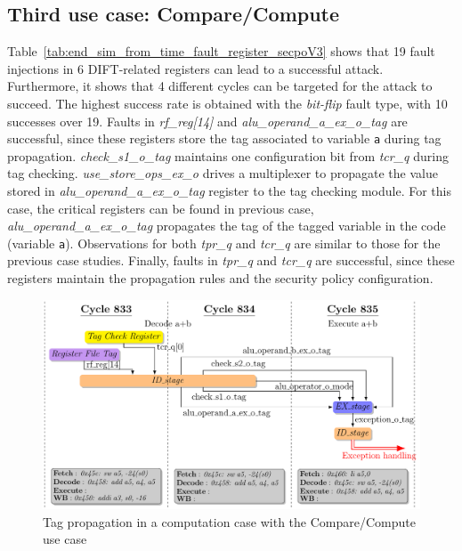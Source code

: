 \subsection{Third use case: Compare/Compute}
Table~\ref{tab:end_sim_from_time_fault_register_secpoV3} shows that 19 fault injections in 6 DIFT-related registers can lead to a successful attack. Furthermore, it shows that 4 different cycles can be targeted for the attack to succeed. The highest success rate is obtained with the \textit{bit-flip} fault type, with 10 successes over 19. 
Faults in \textit{rf\_reg[14]} and \textit{alu\_operand\_a\_ex\_o\_tag} are successful, since these registers store the tag associated to variable \verb|a| during tag propagation. \textit{check\_s1\_o\_tag} maintains one configuration bit from \textit{tcr\_q} during tag checking.
\textit{use\_store\_ops\_ex\_o} drives a multiplexer to propagate the value stored in \textit{alu\_operand\_a\_ex\_o\_tag} register to the tag checking module. 
For this case, the critical registers can be found in previous case, \textit{alu\_operand\_a\_ex\_o\_tag} propagates the tag of the tagged variable in the code (variable \verb|a|). 
Observations for both \textit{tpr\_q} and \textit{tcr\_q} are similar to those for the previous case studies. 
Finally, faults in \textit{tpr\_q} and \textit{tcr\_q} are successful, since these registers maintain the propagation rules and the security policy configuration.

\begin{figure}[ht]
    \centering
    \includegraphics[width=\linewidth]{c3_vulnerabilities_assessment/img/comp_compu/attaquePropag_v3_short.pdf}
    \caption{Tag propagation in a computation case with the Compare/Compute use case}
    \label{fig:study_attack_propag_v3_tag_propagation}
\end{figure}

